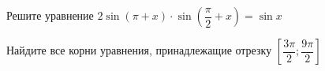\begin{ex}
	\begin{condition}
		\begin{enumcols}[label=\asbuk*)]
			\item Решите уравнение \( 2\sin(\pi + x)\cdot\sin{\left(\dfrac{\pi}{2}+x\right)} = \sin x \)
			\item Найдите все корни уравнения, принадлежащие отрезку \( \left[\dfrac{3\pi}{2};\dfrac{9\pi}{2}\right]  \)
		\end{enumcols}
	\end{condition}
\end{ex}